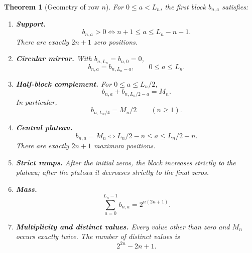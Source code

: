 \documentclass[11pt,a4paper,oneside,openany]{book}
\numberwithin{equation}{chapter}
\newtheorem{theorem}{Theorem}[chapter]
\theoremstyle{definition}
\theoremstyle{remark}
\begin{document}
\begin{theorem}[Geometry of row \(n\)]
For \(0\le a<L_n\), the first block \(b_{n,a}\) satisfies:

\begin{enumerate}
\item \textbf{Support.}
\begin{equation}
 b_{n,a}>0
 \iff
 n+1\le a\le L_n-n-1.
 \label{a:eq:row-support}
\end{equation}
There are exactly \(2n+1\) zero positions.

\item \textbf{Circular mirror.}
With \(b_{n,L_n}=b_{n,0}=0\),
\begin{equation}
 \boxed{b_{n,a}=b_{n,L_n-a},\qquad 0\le a\le L_n.}
 \label{a:eq:row-mirror}
\end{equation}

\item \textbf{Half-block complement.}
For \(0\le a\le L_n/2\),
\begin{equation}
 \boxed{b_{n,a}+b_{n,L_n/2-a}=M_n.}
 \label{a:eq:row-complement}
\end{equation}
In particular,
\begin{equation}
 b_{n,L_n/4}=M_n/2
 \qquad(n\ge1).
 \label{a:eq:quarter-value}
\end{equation}

\item \textbf{Central plateau.}
\begin{equation}
 \boxed{
 b_{n,a}=M_n
 \iff
 L_n/2-n\le a\le L_n/2+n.}
 \label{a:eq:row-plateau}
\end{equation}
There are exactly \(2n+1\) maximum positions.

\item \textbf{Strict ramps.}  After the initial zeros, the block increases
strictly to the plateau; after the plateau it decreases strictly to the final
zeros.

\item \textbf{Mass.}
\begin{equation}
 \boxed{
 \sum_{a=0}^{L_n-1}b_{n,a}=2^{n(2n+1)}.}
 \label{a:eq:row-mass}
\end{equation}

\item \textbf{Multiplicity and distinct values.}  Every value other than
zero and \(M_n\) occurs exactly twice.  The number of distinct values is
\begin{equation}
 \boxed{2^{2n}-2n+1.}
 \label{a:eq:row-distinct}
\end{equation}
\end{enumerate}
\end{theorem}
\end{document}
